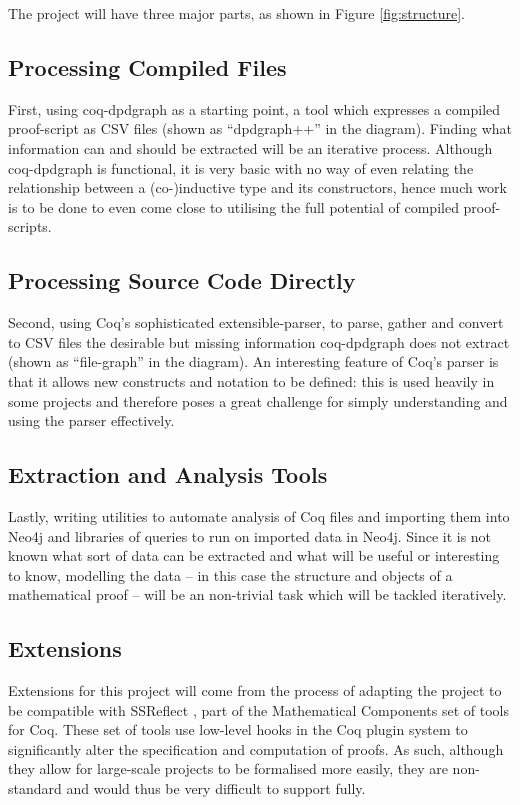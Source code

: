 \documentclass[12pt]{article}
\begin{document}
The project will have three major parts, as shown in Figure \ref{fig:structure}.

\subsection*{Processing Compiled Files}
First, using coq-dpdgraph as a starting point, a tool which expresses a
compiled proof-script as CSV files (shown as ``dpdgraph++'' in the diagram).
Finding what information can and should be extracted will be an iterative
process. Although coq-dpdgraph is functional, it is very basic with no way of
even relating the relationship between a (co-)inductive type and its
constructors, hence much work is to be done to even come close to utilising the
full potential of compiled proof-scripts.

\subsection*{Processing Source Code Directly}
Second, using Coq's sophisticated extensible-parser, to parse, gather and
convert to CSV files the desirable but missing information
coq-dpdgraph does not extract (shown as ``file-graph'' in the diagram). An
interesting feature of Coq's parser is that it allows new constructs and
notation to be defined: this is used heavily in some projects and therefore
poses a great challenge for simply understanding and using the parser
effectively.

\subsection*{Extraction and Analysis Tools}
Lastly, writing utilities to automate analysis of Coq files and importing them into
Neo4j and libraries of queries to run on imported data in Neo4j. Since it is not
known what sort of data can be extracted and what will be useful or interesting to
know, modelling the data -- in this case the structure and objects of a mathematical
proof -- will be an non-trivial task which will be tackled iteratively.

\subsection*{Extensions}

Extensions for this project will come from the process of adapting the project to
be compatible with SSReflect \cite{gonthier2015ssr}, part of the Mathematical
Components set of tools for Coq. These set of tools use low-level hooks in the
Coq plugin system to significantly alter the specification and computation of
proofs. As such, although they allow for large-scale projects to be formalised
more easily, they are non-standard and would thus be very difficult to support
fully.
\end{document}
